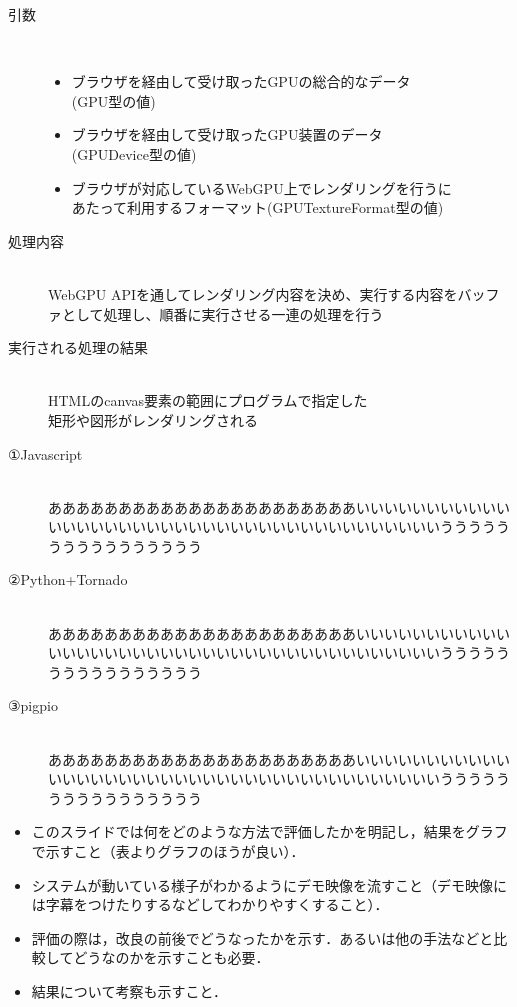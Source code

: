 \begin{description}
	\item[引数]~\\
	\begin{itemize}
		\item ブラウザを経由して受け取ったGPUの総合的なデータ\\(GPU型の値)
		\item ブラウザを経由して受け取ったGPU装置のデータ\\(GPUDevice型の値)
		\item ブラウザが対応しているWebGPU上でレンダリングを行うに\\あたって利用するフォーマット(GPUTextureFormat型の値)
	\end{itemize}
	\newpage
	\item[処理内容]~\\
	WebGPU APIを通してレンダリング内容を決め、実行する内容をバッファとして処理し、順番に実行させる一連の処理を行う
	\item[実行される処理の結果]~\\
	HTMLのcanvas要素の範囲にプログラムで指定した\\矩形や図形がレンダリングされる

\end{description}
\newpage

\begin{description} 
	\item[①Javascript]~\\
	ああああああああああああああああああああああいいいいいいいいいいいいいいいいいいいいいいいいいいいいいいいいいいいいいいいうううううううううううううううう
	\item[②Python+Tornado]~\\
	ああああああああああああああああああああああいいいいいいいいいいいいいいいいいいいいいいいいいいいいいいいいいいいいいいいうううううううううううううううう
	\item[③pigpio]~\\
	ああああああああああああああああああああああいいいいいいいいいいいいいいいいいいいいいいいいいいいいいいいいいいいいいいいうううううううううううううううう
\end{description}
\newpage


\begin{itemize}
	\item このスライドでは何をどのような方法で評価したかを明記し，結果をグラフで示すこと（表よりグラフのほうが良い）．
	\item システムが動いている様子がわかるようにデモ映像を流すこと（デモ映像には字幕をつけたりするなどしてわかりやすくすること）．
	\item 評価の際は，改良の前後でどうなったかを示す．あるいは他の手法などと比較してどうなのかを示すことも必要．
	\item 結果について考察も示すこと．
\end{itemize}
\newpage

